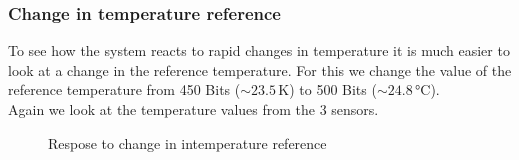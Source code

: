\documentclass[12pt]{scrartcl}
\begin{document}
      \subsubsection{Change in temperature reference}
      To see how the system reacts to rapid changes in temperature it is much
      easier to look at a change in the reference temperature. For this we
      change the value of the reference temperature from 450 Bits ($\sim 23.5
      \,\text{K}$) to 500 Bits ($\sim 24.8 \,\text{°C}$). \\
      Again we look at the temperature values from the 3 sensors.
      \begin{figure}[h!]
        \hspace{-40pt}
        \hspace{-20pt}
        \caption{Respose to change in intemperature reference}
        \label{fig12}
      \end{figure} \\
\end{document}
